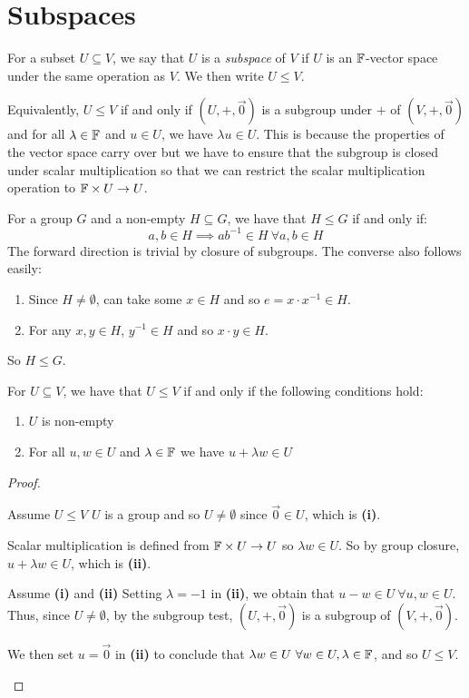\documentclass[../main.tex]{subfiles}
\begin{document}
\section{Subspaces}
\begin{definition}[Subspace]
  For a subset $U \subseteq V$, we say that $U$ is a \textit{subspace} of $V$ if $U$ is an $\mathbb{F}$-vector space under the same operation as $V$.
  We then write $U \leq V$.
\end{definition}
Equivalently, $U \leq V$ if and only if $(U, +, \vec{0})$ is a subgroup under $+$ of $(V, +, \vec{0})$ and for all $\lambda \in \mathbb{F}$ and $u \in U$, we have $\lambda u \in U$.
This is because the properties of the vector space carry over but we have to ensure that the subgroup is closed under scalar multiplication so that we can restrict the scalar multiplication operation to $\mathbb{F} \times U \to U$.
\begin{remark}
  For a group $G$ and a non-empty $H \subseteq G$, we have that $H \leq G$ if and only if:
  \[
    a, b \in H \implies ab^{-1} \in H\ \forall a, b \in H
  \]
  The forward direction is trivial by closure of subgroups.
  The converse also follows easily:
  \begin{enumerate}
    \item Since $H \neq \emptyset$, can take some $x \in H$ and so $e = x \cdot x^{-1} \in H$.
    \item For any $x, y \in H$, $y^{-1} \in H$ and so $x \cdot y \in H$.
  \end{enumerate}
  So $H \leq G$.
\end{remark}
\begin{proposition}
  For $U \subseteq V$, we have that $U \leq V$ if and only if the following conditions hold: \label{subspaceTest}
  \begin{enumerate}
    \item $U$ is non-empty
    \item For all $u, w \in U$ and $\lambda \in \mathbb{F}$ we have $u + \lambda w \in U$
  \end{enumerate}
\end{proposition}
\begin{proof}
  \begin{proofdirection}{Assume $U \leq V$}
    $U$ is a group and so $U \neq \emptyset$ since $\vec{0} \in U$, which is \textbf{(i)}.

    Scalar multiplication is defined from $\mathbb{F} \times U \to U$ so $\lambda w \in U$.
    So by group closure, $u + \lambda w \in U$, which is \textbf{(ii)}.
  \end{proofdirection}
  \begin{proofdirection}{Assume \textbf{(i)} and \textbf{(ii)}}
    Setting $\lambda = -1$ in \textbf{(ii)}, we obtain that $u - w \in U\ \forall u, w \in U$.
    Thus, since $U \neq \emptyset$, by the subgroup test, $(U, +, \vec{0})$ is a subgroup of $(V, +, \vec{0})$.

    We then set $u = \vec{0}$ in \textbf{(ii)} to conclude that $\lambda w \in U\ \forall w \in U, \lambda \in \mathbb{F}$, and so $U \leq V$.
  \end{proofdirection}
\end{proof}
\end{document}
